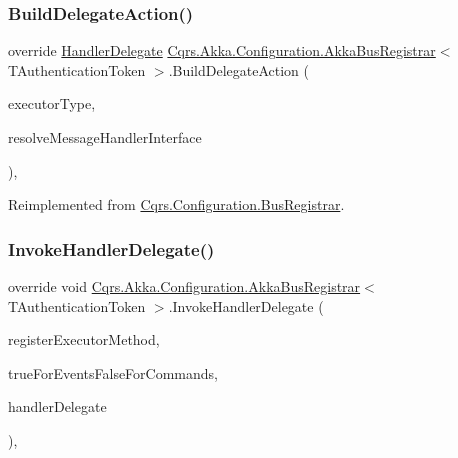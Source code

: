 \subsubsection{\texorpdfstring{Build\+Delegate\+Action()}{BuildDelegateAction()}}
{\footnotesize\ttfamily override \hyperlink{classCqrs_1_1Configuration_1_1HandlerDelegate}{Handler\+Delegate} \hyperlink{classCqrs_1_1Akka_1_1Configuration_1_1AkkaBusRegistrar}{Cqrs.\+Akka.\+Configuration.\+Akka\+Bus\+Registrar}$<$ T\+Authentication\+Token $>$.Build\+Delegate\+Action (\begin{DoxyParamCaption}\item[{Type}]{executor\+Type,  }\item[{Func$<$ Type, I\+Enumerable$<$ Type $>$$>$}]{resolve\+Message\+Handler\+Interface }\end{DoxyParamCaption})\hspace{0.3cm}{\ttfamily [protected]}, {\ttfamily [virtual]}}



Reimplemented from \hyperlink{classCqrs_1_1Configuration_1_1BusRegistrar_a07d27088739f2ae0ac7c551fc6a72ac9_a07d27088739f2ae0ac7c551fc6a72ac9}{Cqrs.\+Configuration.\+Bus\+Registrar}.

\mbox{\label{classCqrs_1_1Akka_1_1Configuration_1_1AkkaBusRegistrar_a0ac474751b2ba8ebb27b885a15fbf053_a0ac474751b2ba8ebb27b885a15fbf053}} 
\subsubsection{\texorpdfstring{Invoke\+Handler\+Delegate()}{InvokeHandlerDelegate()}}
{\footnotesize\ttfamily override void \hyperlink{classCqrs_1_1Akka_1_1Configuration_1_1AkkaBusRegistrar}{Cqrs.\+Akka.\+Configuration.\+Akka\+Bus\+Registrar}$<$ T\+Authentication\+Token $>$.Invoke\+Handler\+Delegate (\begin{DoxyParamCaption}\item[{Method\+Info}]{register\+Executor\+Method,  }\item[{bool}]{true\+For\+Events\+False\+For\+Commands,  }\item[{\hyperlink{classCqrs_1_1Configuration_1_1HandlerDelegate}{Handler\+Delegate}}]{handler\+Delegate }\end{DoxyParamCaption})\hspace{0.3cm}{\ttfamily [protected]}, {\ttfamily [virtual]}}



